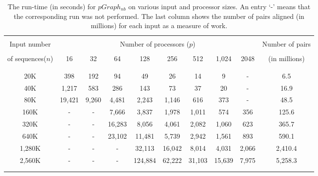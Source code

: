\documentclass[10pt,journal,letterpaper,compsoc]{IEEEtran}
\def\colrule{\\[-7pt]\hline\\[-6pt]}
\begin{document}
\begin{table}[thb]
\begin{center}
\begin{tabular}{ccccccccc||c}
\colrule
Input number & \multicolumn{8}{c||}{Number of processors ($p$)}& Number of pairs\\[2pt]  \cline{2-9} \\[-7pt]
\multicolumn{1}{c}{of sequences($n$)} & 16 & 32 & 64 & 128 & 256 & 512 & 1,024 & 2048 &  (in millions)\\
 \colrule
 20K & 398 & 192 & 94 & 49 & 26 & 14 & 9 & - & 6.5 \\
 40K & 1,217 & 583 & 286 & 143 & 73 & 37 &  20 & - & 16.9\\
 80K & 19,421  & 9,260  & 4,481 & 2,243 & 1,146 & 616 & 373 & - & 48.5\\
 160K & -  & - & 7,666 & 3,837 & 1,978  & 1,011  & 574 & 356 & 125.6\\
 320K & - & - &  16,283 & 8,056 & 4,061 & 2,082 & 1,060 & 623 & 365.7\\
 640K & - & - & 23,102 & 11,481 & 5,739  & 2,942  & 1,561 & 893 & 590.1 \\
 1,280K & - & - & - & 32,113 & 16,042  & 8,014  & 4,031 & 2,066 & 2,410.4 \\
 2,560K & - & - & - & 124,884 & 62,222  & 31,103  & 15,639 & 7,975 & 5,258.3\\
 \colrule
\end{tabular}
\end{center}
\caption{\label{tabRuntime}
The run-time (in seconds) for $pGraph_{nb}$ on various input and processor sizes. An entry `-' means that the corresponding run was not performed. The last column shows the number of pairs aligned (in millions) for each input as a measure of work.
}
\end{table}
\end{document}
